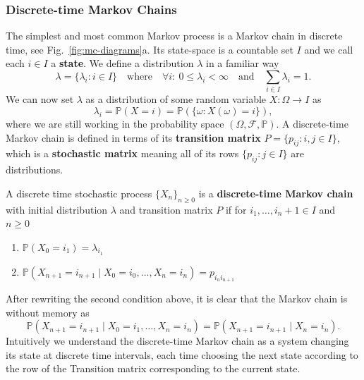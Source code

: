 \subsubsection{Discrete-time Markov Chains}
The simplest and most common Markov process is a Markov chain in discrete time, see Fig.~\ref{fig:mc-diagrams}a. Its state-space is a countable set $I$ and we call each $i \in I$ a \textbf{state}. We define a distribution $\lambda$ in a familiar way
\begin{equation}
	\lambda = \{\lambda_i : i \in I\} \quad \text{where} \quad \forall i:~ 0 \leq \lambda_i < \infty \quad \text{and} \quad \sum_{i \in I} \lambda_i = 1.
\end{equation}
We can now set $\lambda$ as a distribution of some random variable $X:\Omega \rightarrow I$ as
\begin{equation}
	\lambda_{i}=\mathbb{P}(X=i)=\mathbb{P}(\{\omega: X(\omega)=i\}),
\end{equation}
where we are still working in the probability space $(\Omega, \mathcal{F}, \mathbb{P})$. A discrete-time Markov chain is defined in terms of its \textbf{transition matrix} $P=\{p_{i j}: i, j \in I\}$, which is a \textbf{stochastic matrix} meaning all of its rows $\{p_{i j}: j \in I\}$ are distributions.
\begin{definition}
	A discrete time stochastic process $\{X_n\}_{n \geq 0}$ is a \textbf{discrete-time Markov chain} with initial distribution $\lambda$ and transition matrix $P$ if for $i_1, \dots, i_n+1 \in I$ and $n \geq 0$
	\begin{enumerate}[label=\roman*)]
		\item $\mathbb{P}\left(X_{0}=i_{1}\right)=\lambda_{i_{1}}$
		\item $\mathbb{P}\left(X_{n+1}=i_{n+1} \mid X_{0}=i_{0}, \dots, X_{n}=i_{n}\right)=p_{i_{n} i_{n+1}}$
	\end{enumerate}
\end{definition}
After rewriting the second condition above, it is clear that the Markov chain is without memory as
\begin{equation}
	\mathbb{P}\left(X_{n+1}=i_{n+1} \mid X_{0}=i_{1}, \dots, X_{n}=i_{n}\right)=\mathbb{P}(X_{n+1} = i_{n+1} \mid X_{n} = i_{n}).
\end{equation}
Intuitively we understand the discrete-time Markov chain as a system changing its state at discrete time intervals, each time choosing the next state according to the row of the Transition matrix corresponding to the current state.
